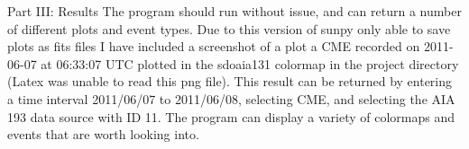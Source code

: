\documentclass[12pt]{article}
\begin{document}
Part III: Results
The program should run without issue, and can return a number of different plots and event types. Due to this version of sunpy only able to save plots as fits files I have included a screenshot of a plot a CME recorded on 2011-06-07 at 06:33:07 UTC plotted in the sdoaia131 colormap in the project directory (Latex was unable to read this png file). This result can be returned by entering a time interval 2011/06/07 to 2011/06/08, selecting CME, and selecting the AIA 193 data source with ID 11. The program can display a variety of colormaps and events that are worth looking into.
\end{document}
